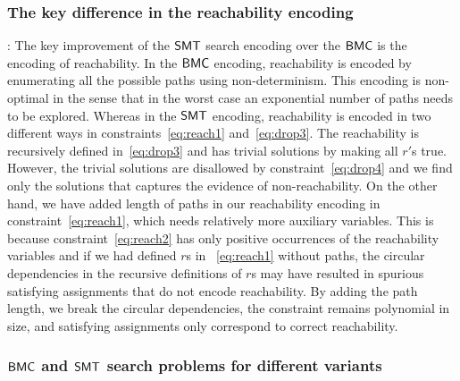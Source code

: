 
\subsubsection{The key difference in the reachability encoding}:
The key improvement of the $\mathsf{SMT}$ search encoding over the $\mathsf{BMC}$ is the
encoding of reachability.
%
In the $\mathsf{BMC}$ encoding, reachability is encoded by enumerating all the possible paths using non-determinism.
%
This encoding is non-optimal in the sense that in the worst case an exponential number of paths needs to be explored.
%
Whereas in the $\mathsf{SMT}$ encoding, reachability is encoded in two different
ways in constraints~\eqref{eq:reach1} and~\eqref{eq:drop3}.
%
The reachability is recursively defined in~\eqref{eq:drop3} and has
trivial solutions by making all $r'$s true.
%
However, the trivial solutions are disallowed by constraint~\eqref{eq:drop4} and we find
only the solutions that captures the evidence of non-reachability.
%
On the other hand, we have added length of paths in our reachability encoding in constraint~\eqref{eq:reach1}, which needs relatively more auxiliary variables.
%
This is because constraint~\eqref{eq:reach2} has only positive
occurrences of the reachability variables and if we had defined
$r$s in ~\eqref{eq:reach1} without paths,
the circular dependencies in the recursive definitions of $r$s
may have resulted in spurious satisfying assignments that
do not encode reachability.
%
By adding the path length, we break the circular dependencies, the
constraint remains polynomial in size, and satisfying assignments only
correspond to correct reachability.



\subsubsection{$\mathsf{BMC}$ and $\mathsf{SMT}$ search problems for different variants}

